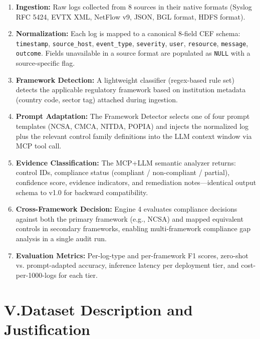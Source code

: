 \documentclass[12pt]{article}
\begin{document}
\begin{enumerate}
    \item \textbf{Ingestion:} Raw logs collected from 8 sources in their native formats (Syslog RFC 5424, EVTX XML, NetFlow v9, JSON, BGL format, HDFS format).

    \item \textbf{Normalization:} Each log is mapped to a canonical 8-field CEF schema: \texttt{timestamp}, \texttt{source\_host}, \texttt{event\_type}, \texttt{severity}, \texttt{user}, \texttt{resource}, \texttt{message}, \texttt{outcome}. Fields unavailable in a source format are populated as \texttt{NULL} with a source-specific flag.

    \item \textbf{Framework Detection:} A lightweight classifier (regex-based rule set) detects the applicable regulatory framework based on institution metadata (country code, sector tag) attached during ingestion.

    \item \textbf{Prompt Adaptation:} The Framework Detector selects one of four prompt templates (NCSA, CMCA, NITDA, POPIA) and injects the normalized log plus the relevant control family definitions into the LLM context window via MCP tool call.

    \item \textbf{Evidence Classification:} The MCP+LLM semantic analyzer returns: control IDs, compliance status (compliant / non-compliant / partial), confidence score, evidence indicators, and remediation notes---identical output schema to v1.0 for backward compatibility.

    \item \textbf{Cross-Framework Decision:} Engine 4 evaluates compliance decisions against both the primary framework (e.g., NCSA) and mapped equivalent controls in secondary frameworks, enabling multi-framework compliance gap analysis in a single audit run.

    \item \textbf{Evaluation Metrics:} Per-log-type and per-framework F1 scores, zero-shot vs. prompt-adapted accuracy, inference latency per deployment tier, and cost-per-1000-logs for each tier.
\end{enumerate}

\bigskip

\section*{V.\quad Dataset Description and Justification}
\end{document}

